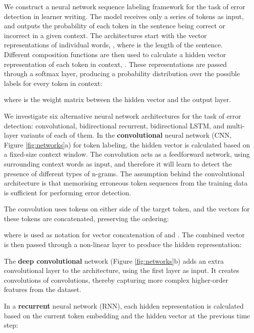 \documentclass[11pt]{article}
\begin{document}
We construct a neural network sequence labeling framework for the task of error detection in learner writing.
The model receives only a series of tokens as input, and outputs the probability of each token in the sentence being correct or incorrect in a given context.
The architectures start with the vector representations of individual words, , where  is the length of the sentence. 
Different composition functions are then used to calculate a hidden vector representation of each token in context, .
These representations are passed through a softmax layer, producing a probability distribution over the possible labels for every token in context:



\noindent where  is the weight matrix between the hidden vector  and the output layer. 

We investigate six alternative neural network architectures for the task of error detection: convolutional, bidirectional recurrent, bidirectional LSTM, and multi-layer variants of each of them.
In the \textbf{convolutional} neural network (CNN, Figure \ref{fig:networks}a) for token labeling, the hidden vector  is calculated based on a fixed-size context window.
The convolution acts as a feedforward network, using surrounding context words as input, and therefore it will learn to detect the presence of different types of n-grams.
The assumption behind the convolutional architecture is that memorising erroneous token sequences from the training data is sufficient for performing error detection. 

The convolution uses  tokens on either side of the target token, and the vectors for these tokens are concatenated, preserving the ordering:



\noindent where  is used as notation for vector concatenation of  and .
The combined vector is then passed through a non-linear layer to produce the hidden representation:



The \textbf{deep convolutional} network (Figure \ref{fig:networks}b) adds an extra convolutional layer to the architecture, using the first layer as input. It creates convolutions of convolutions, thereby capturing more complex higher-order features from the dataset.


In a \textbf{recurrent} neural network (RNN), each hidden representation is calculated based on the current token embedding and the hidden vector at the previous time step:
\end{document}
